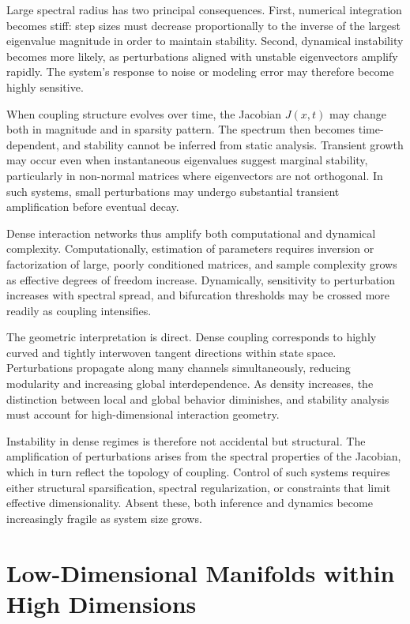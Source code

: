 \documentclass[12pt]{book}
\begin{document}
Large spectral radius has two principal consequences. First, numerical integration becomes stiff: step sizes must decrease proportionally to the inverse of the largest eigenvalue magnitude in order to maintain stability. Second, dynamical instability becomes more likely, as perturbations aligned with unstable eigenvectors amplify rapidly. The system's response to noise or modeling error may therefore become highly sensitive.

When coupling structure evolves over time, the Jacobian $J(x,t)$ may change both in magnitude and in sparsity pattern. The spectrum then becomes time-dependent, and stability cannot be inferred from static analysis. Transient growth may occur even when instantaneous eigenvalues suggest marginal stability, particularly in non-normal matrices where eigenvectors are not orthogonal. In such systems, small perturbations may undergo substantial transient amplification before eventual decay.

Dense interaction networks thus amplify both computational and dynamical complexity. Computationally, estimation of parameters requires inversion or factorization of large, poorly conditioned matrices, and sample complexity grows as effective degrees of freedom increase. Dynamically, sensitivity to perturbation increases with spectral spread, and bifurcation thresholds may be crossed more readily as coupling intensifies.

The geometric interpretation is direct. Dense coupling corresponds to highly curved and tightly interwoven tangent directions within state space. Perturbations propagate along many channels simultaneously, reducing modularity and increasing global interdependence. As density increases, the distinction between local and global behavior diminishes, and stability analysis must account for high-dimensional interaction geometry.

Instability in dense regimes is therefore not accidental but structural. The amplification of perturbations arises from the spectral properties of the Jacobian, which in turn reflect the topology of coupling. Control of such systems requires either structural sparsification, spectral regularization, or constraints that limit effective dimensionality. Absent these, both inference and dynamics become increasingly fragile as system size grows.

\section{Low-Dimensional Manifolds within High Dimensions}
\end{document}
